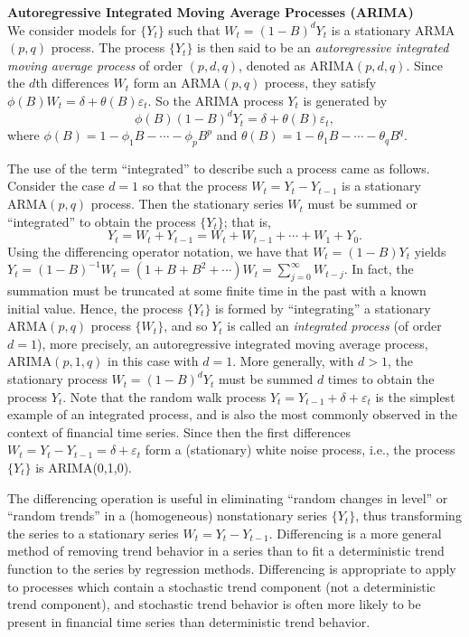 \noindent\textbf{Autoregressive Integrated Moving Average Processes (ARIMA)} \\


We consider models for $\{Y_t\}$ such that $W_t = (1 - B)^d Y_t$ is a stationary ARMA$(p,q)$ process. The process $\{Y_t\}$ is then said to be an \textit{autoregressive integrated moving average process} of order $(p,d,q)$, denoted as ARIMA$(p,d,q)$. Since the $d$th differences $W_t$ form an ARMA$(p,q)$ process, they satisfy $\phi(B)W_t = \delta + \theta(B)\varepsilon_t$. So the ARIMA process $Y_t$ is generated by 
	\begin{equation} \label{eqn:phiBdy}
	\phi(B)(1 - B)^dY_t = \delta + \theta(B)\varepsilon_t,
	\end{equation}
where $\phi(B) = 1 - \phi_1B - \cdots - \phi_pB^p$ and $\theta(B) = 1 - \theta_1B - \cdots - \theta_qB^q$.


The use of the term ``integrated'' to describe such a process came as follows. Consider the case $d=1$ so that the process $W_t = Y_t - Y_{t-1}$ is a stationary ARMA$(p,q)$ process. Then the stationary series $W_t$ must be summed or ``integrated'' to obtain the process $\{Y_t\}$; that is,
	\[
	Y_t = W_t + Y_{t-1} = W_t + W_{t-1} + \cdots + W_1 + Y_0.
	\]
Using the differencing operator notation, we have that $W_t = (1 - B)Y_t$ yields $Y_t = (1 - B)^{-1}W_t = (1 + B + B^2 + \cdots)W_t = \sum_{j=0}^\infty W_{t-j}$. In fact, the summation must be truncated at some finite time in the past with a known initial value. Hence, the process $\{Y_t\}$ is formed by ``integrating'' a stationary ARMA$(p,q)$ process $\{W_t\}$, and so $Y_t$ is called an \textit{integrated process} (of order $d=1$), more precisely, an autoregressive integrated moving average process, ARIMA$(p,1,q)$ in this case with $d=1$. More generally, with $d>1$, the stationary process $W_t = (1 - B)^dY_t$ must be summed $d$ times to obtain the process $Y_t$. Note that the random walk process $Y_t = Y_{t-1} + \delta + \varepsilon_t$ is the simplest example of an integrated process, and is also the most commonly observed in the context of financial time series. Since then the first differences $W_t = Y_t - Y_{t-1} = \delta + \varepsilon_t$ form a (stationary) white noise process, i.e., the process $\{Y_t\}$ is ARIMA(0,1,0).


The differencing operation is useful in eliminating ``random changes in level'' or ``random trends'' in a (homogeneous) nonstationary series $\{Y_t\}$, thus transforming the series to a stationary series $W_t = Y_t - Y_{t-1}$. Differencing is a more general method of removing trend behavior in a series than to fit a deterministic trend function to the series by regression methods. Differencing is appropriate to apply to processes which contain a stochastic trend component (not a deterministic trend component), and stochastic trend behavior is often more likely to be present in financial time series than deterministic trend behavior.


